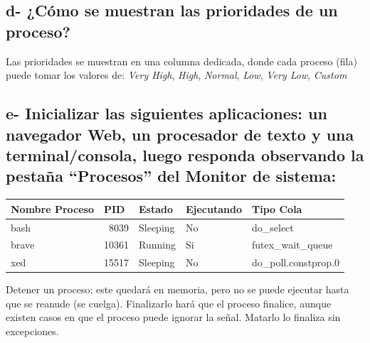\documentclass{article}
\begin{document}
\subsection*{d- ¿Cómo se muestran las prioridades de un proceso?}

\noindent
Las prioridades se muestran en una columna dedicada, donde cada proceso (fila) puede tomar los valores de: \textit{Very High}, \textit{High}, \textit{Normal}, 
\textit{Low}, \textit{Very Low}, \textit{Custom}

\subsection*{e- Inicializar las siguientes aplicaciones: un navegador Web, un procesador de texto y una
terminal/consola, luego responda observando la pestaña “Procesos” del Monitor de sistema:}


\begin{table}[htbp]
  \centering
    \begin{tabular}{|lrlll|}
    \toprule
    \rowcolor[rgb]{ .357,  .608,  .835} \textcolor[rgb]{ 1,  1,  1}{\textbf{Nombre Proceso}} & \multicolumn{1}{l}{\textcolor[rgb]{ 1,  1,  1}{\textbf{PID}}} & \textcolor[rgb]{ 1,  1,  1}{\textbf{Estado}} & \textcolor[rgb]{ 1,  1,  1}{\textbf{Ejecutando}} & \textcolor[rgb]{ 1,  1,  1}{\textbf{Tipo Cola}} \\
    \midrule
    \rowcolor[rgb]{ .867,  .922,  .969} bash  & 8039  & Sleeping & No    & do\_select \\
    \midrule
    brave & 10361 & Running & Si    & futex\_wait\_queue \\
    \midrule
    \rowcolor[rgb]{ .867,  .922,  .969} xed   & 15517 & Sleeping & No    & do\_poll.constprop.0 \\
    \bottomrule
    \end{tabular}%
  \label{tab:monitor_sistema}%
\end{table}%
 
 \begin{warn}[]
    \noindent
    Detener un proceso; este quedará en memoria, pero no se puede ejecutar hasta que se reanude 
    (se cuelga). Finalizarlo hará que el proceso finalice, aunque existen casos en que el proceso 
    puede ignorar la señal. Matarlo lo finaliza sin excepciones.
 \end{warn}
\end{document}
